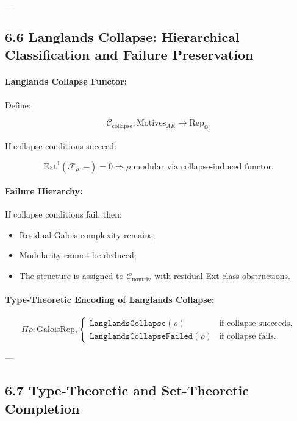 \documentclass[11pt]{article}
\begin{document}
---

\subsection*{6.6 Langlands Collapse: Hierarchical Classification and Failure Preservation}

\paragraph{Langlands Collapse Functor:}
Define:

\[
\mathcal{C}_{\mathrm{collapse}} : \mathrm{Motives}_{AK} \longrightarrow \mathrm{Rep}_{\mathbb{Q}_\ell}
\]

If collapse conditions succeed:

\[
\mathrm{Ext}^1(\mathcal{F}_\rho, -) = 0 \Rightarrow \rho \text{ modular via collapse-induced functor}.
\]

\paragraph{Failure Hierarchy:}
If collapse conditions fail, then:

\begin{itemize}
    \item Residual Galois complexity remains;
    \item Modularity cannot be deduced;
    \item The structure is assigned to \( \mathcal{C}_{\mathrm{nontriv}} \) with residual Ext-class obstructions.
\end{itemize}

\paragraph{Type-Theoretic Encoding of Langlands Collapse:}

\[
\Pi \rho : \mathrm{GaloisRep},
\begin{cases}
\texttt{LanglandsCollapse}(\rho) & \text{if collapse succeeds}, \\
\texttt{LanglandsCollapseFailed}(\rho) & \text{if collapse fails}.
\end{cases}
\]

---

\subsection*{6.7 Type-Theoretic and Set-Theoretic Completion}
\end{document}
